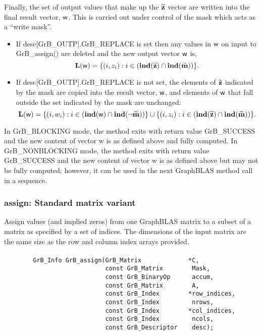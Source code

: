 Finally, the set of output values that make up the ${\bf \widetilde{z}}$ 
vector are written into the final result vector, ${\sf w}$. 
This is carried out under control of the mask which acts as a ``write mask''.
\begin{itemize}
\item If {\sf desc[GrB\_OUTP].GrB\_REPLACE} is set then any values in ${\sf w}$ 
on input to {\sf GrB\_assign()} are deleted and the new output vector ${\sf w}$ is,
\[ \bold{L}({\sf w}) = \{(i,z_{i}) : i \in (\bold{ind}({\bf \widetilde{z}}) 
\cap \bold{ind}({\bf \widetilde{m}})) \}. \]

\item If {\sf desc[GrB\_OUTP].GrB\_REPLACE} is not set, the elements of 
${\bf \widetilde{z}}$ indicated by 
the mask are copied into the result vector, ${\sf w}$, and elements of 
${\sf w}$ that fall outside the set indicated by the mask are unchanged:
\[ \bold{L}({\sf w}) = \{(i,w_{i}) : i \in (\bold{ind}({\bf \sf w}) 
\cap \bold{ind}(\neg {\bf \widetilde{m}})) \} \cup \{(i,z_{i}) : i \in 
(\bold{ind}({\bf \widetilde{z}}) \cap \bold{ind}({\bf \widetilde{m}})) \}. \]
\end{itemize}

In {\sf GrB\_BLOCKING} mode, the method exits with return value 
{\sf GrB\_SUCCESS} and the new content of vector {\sf w} is as defined above
and fully computed.  
In {\sf GrB\_NONBLOCKING} mode, the method exits with return value 
{\sf GrB\_SUCCESS} and the new content of vector {\sf w} is as defined above 
but may not be fully computed; however, it can be used in the next GraphBLAS 
method call in a sequence.


\subsubsection{{\sf assign}: Standard matrix variant}

Assign values (and implied zeros) from one GraphBLAS matrix to a subset of a 
matrix as specified by a set of indices. The dimensions of the input matrix are
the same size as the row and column index arrays provided.

\paragraph{\syntax}

\begin{verbatim}
        GrB_Info GrB_assign(GrB_Matrix             *C,
                            const GrB_Matrix        Mask,
                            const GrB_BinaryOp      accum,
                            const GrB_Matrix        A,
                            const GrB_Index        *row_indices,
                            const GrB_Index         nrows,
                            const GrB_Index        *col_indices,
                            const GrB_Index         ncols,
                            const GrB_Descriptor    desc);
\end{verbatim}

